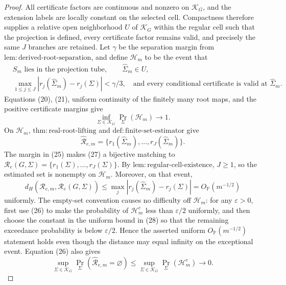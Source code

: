 \documentclass{article}
\begin{document}
\begin{proof}
All certificate factors are continuous and nonzero on \(\mathcal K_G\), and the extension labels are locally constant on the selected cell.  Compactness therefore supplies a relative open neighborhood \(U\) of \(\mathcal K_G\) within the regular cell such that the projection is defined, every certificate factor remains valid, and precisely the same \(J\) branches are retained.  Let \(\gamma\) be the separation margin from \(\mathrm{lem:derived\mbox{-}root\mbox{-}separation}\), and define \(\mathcal H_m\) to be the event that
\[
 \begin{split}
 &S_m\text{ lies in the projection tube},\qquad \widehat\Sigma_m\in U,\\
 &\max_{1\leq j\leq J}|r_j(\widehat\Sigma_m)-r_j(\Sigma)|<\gamma/3,
 \quad\text{and every conditional certificate is valid at }\widehat\Sigma_m.
 \end{split}
\tag{25}
\]
Equations (20), (21), uniform continuity of the finitely many root maps, and the positive certificate margins give
\[
 \inf_{\Sigma\in\mathcal K_G}\Pr_\Sigma(\mathcal H_m)\longrightarrow1.
\tag{26}
\]
On \(\mathcal H_m\), \(\mathrm{thm:real\mbox{-}root\mbox{-}lifting}\) and \(\mathrm{def:finite\mbox{-}set\mbox{-}estimator}\) give
\[
 \widehat{\mathcal R}_{e,m}
 =\{r_1(\widehat\Sigma_m),\ldots,r_J(\widehat\Sigma_m)\}.
\tag{27}
\]
The margin in (25) makes (27) a bijective matching to
\(\mathcal R_e(G,\Sigma)=\{r_1(\Sigma),\ldots,r_J(\Sigma)\}\).  By \(\mathrm{lem:regular\mbox{-}cell\mbox{-}existence}\), \(J\geq1\), so the estimated set is nonempty on \(\mathcal H_m\).  Moreover, on that event,
\[
 d_H\!\left(\widehat{\mathcal R}_{e,m},\mathcal R_e(G,\Sigma)\right)
 \leq\max_j|r_j(\widehat\Sigma_m)-r_j(\Sigma)|
 =O_{\mathbb P}(m^{-1/2})
\tag{28}
\]
uniformly.  The empty-set convention causes no difficulty off \(\mathcal H_m\): for any \(\varepsilon>0\), first use (26) to make the probability of \(\mathcal H_m^c\) less than \(\varepsilon/2\) uniformly, and then choose the constant in the uniform bound in (28) so that the remaining exceedance probability is below \(\varepsilon/2\).  Hence the asserted uniform \(O_{\mathbb P}(m^{-1/2})\) statement holds even though the distance may equal infinity on the exceptional event.  Equation (26) also gives
\[
 \sup_{\Sigma\in\mathcal K_G}
 \Pr_\Sigma(\widehat{\mathcal R}_{e,m}=\varnothing)
 \leq
 \sup_{\Sigma\in\mathcal K_G}\Pr_\Sigma(\mathcal H_m^c)
 \longrightarrow0.
\tag{29}
\]


\end{proof}
\end{document}
